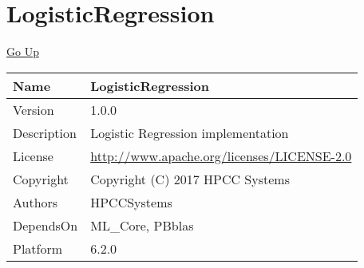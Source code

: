 \chapter*{\color{headtoc} LogisticRegression}
\hypertarget{ecldoc:toc:root/LogisticRegression}{}
\hyperlink{ecldoc:toc:}{Go Up}

\begin{tabularx}{\textwidth}{|l|X|}
\hline
Name &
LogisticRegression
 \\
\hline
Version &
1.0.0
 \\
\hline
Description &
Logistic Regression implementation
 \\
\hline
License &
\url{http://www.apache.org/licenses/LICENSE-2.0}
 \\
\hline
Copyright &
Copyright (C) 2017 HPCC Systems
 \\
\hline
Authors &
HPCCSystems
 \\
\hline
DependsOn &
ML\_Core, PBblas
 \\
\hline
Platform &
6.2.0
 \\
\hline
\end{tabularx}

